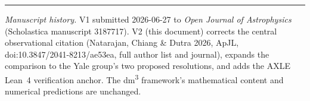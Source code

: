\documentclass[11pt,a4paper]{article}
\theoremstyle{definition}
\theoremstyle{remark}
\begin{document}
\vspace{1em}
\noindent\rule{\textwidth}{0.4pt}
\noindent\footnotesize\textit{Manuscript history.} V1 submitted 2026-06-27 to \emph{Open Journal of Astrophysics} (Scholastica manuscript 3187717). V2 (this document) corrects the central observational citation (Natarajan, Chiang \& Dutra 2026, ApJL, doi:10.3847/2041-8213/ae53ea, full author list and journal), expands the comparison to the Yale group's two proposed resolutions, and adds the AXLE Lean~4 verification anchor. The dm\textsuperscript{3} framework's mathematical content and numerical predictions are unchanged.
\end{document}
